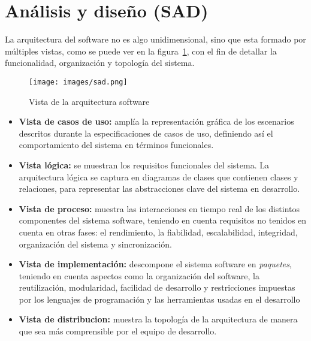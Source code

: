 
\section{Análisis y diseño (SAD)}

La arquitectura del software no es algo unidimensional, sino que esta formado 
por múltiples vistas, como se puede ver en la figura~\ref{fig:sad}, con el 
fin de detallar la funcionalidad, organización y topología del sistema.

\begin{figure}[hp]
	\centering
	\texttt{[image: images/sad.png]}
	\caption{Vista de la arquitectura software}
	\label{fig:sad}
\end{figure}

\begin{itemize}
  \item \textbf{Vista de casos de uso:} amplía la representación gráfica 
	de los escenarios descritos durante la especificaciones de casos 
	de uso, definiendo así el comportamiento del sistema en términos 
	funcionales.
  \item \textbf{Vista lógica:} se muestran los requisitos funcionales 
	del sistema. La arquitectura lógica se captura en diagramas de clases 
	que contienen clases y relaciones, para representar las abstracciones 
	clave del sistema en desarrollo.
  \item \textbf{Vista de proceso:} muestra las interacciones en tiempo real de
	los distintos componentes del sistema software, teniendo en cuenta
	requisitos no tenidos en cuenta en otras fases: el rendimiento, la 
	fiabilidad, escalabilidad, integridad, organización del sistema y 
	sincronización. 
  \item \textbf{Vista de implementación:} descompone el sistema software en
	\emph{paquetes}, teniendo en cuenta aspectos como la organización del 
	software, la reutilización, modularidad, facilidad de desarrollo y 
	restricciones impuestas por los lenguajes de programación y las 
	herramientas usadas en el desarrollo
  \item \textbf{Vista de distribucion:} muestra la topología de la arquitectura
	de manera que sea más comprensible por el equipo de desarrollo.
\end{itemize}












